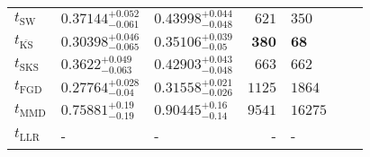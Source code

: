 \begin{tabular}{l|llr|llr}
	\midrule
	$t_{\mathrm{SW}}$ & $0.37144_{-0.061}^{+0.052}$ & $0.43998_{-0.048}^{+0.044}$ & $621$ & $350$ \\
	$t_{\overline{\mathrm{KS}}}$ & $0.30398_{-0.065}^{+0.046}$ & $0.35106_{-0.05}^{+0.039}$ & ${\mathbf{380}}$ & ${\mathbf{68}}$ \\
	$t_{\mathrm{SKS}}$ & $0.3622_{-0.063}^{+0.049}$ & $0.42903_{-0.048}^{+0.043}$ & $663$ & $662$ \\
	$t_{\mathrm{FGD}}$ & ${\mathbf{0.27764_{-0.04}^{+0.028}}}$ & ${\mathbf{0.31558_{-0.026}^{+0.021}}}$ & $1125$ & $1864$ \\
	$t_{\mathrm{MMD}}$ & $0.75881_{-0.19}^{+0.19}$ & $0.90445_{-0.14}^{+0.16}$ & $9541$ & $16275$ \\
	$t_{\mathrm{LLR}}$ & - & - & - & - \\
	\bottomrule
\end{tabular}